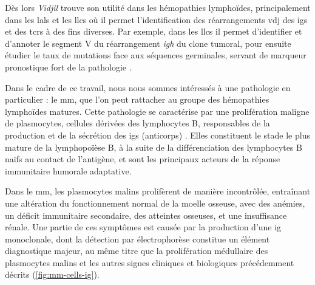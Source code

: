 

Dès lors \textit{Vidjil} trouve son utilité dans les hémopathies lymphoïdes, principalement dans les \glspl{lal} et les 
\glspl{llc} où il permet l'identification des réarrangements \gls{vdj} des \glspl{ig} et des \glspl{tcr} à des fins diverses.
Par exemple, dans les \glspl{llc} il permet d'identifier et d'annoter le segment V du réarrangement \textit{\gls{igh}} du clone tumoral, pour 
ensuite étudier le taux de mutations face aux séquences germinales, servant de marqueur pronostique fort de la pathologie
\cite{crombieIGHVMutationalStatus2017}.

\vspace{1em}

Dans le cadre de ce travail, nous nous sommes intéressés à une pathologie en particulier : le \gls{mm}, que l'on peut rattacher
au groupe des hémopathies lymphoïdes matures. Cette pathologie se caractérise par une prolifération maligne de plasmocytes, cellules
dérivées des lymphocytes B, responsables de la production et de la sécrétion des \glspl{ig} (anticorps) \cite{briglePathobiologyDiagnosisMultiple2017}. 
Elles constituent le stade le plus mature de la lymphopoïèse B, à la suite de la différenciation des lymphocytes B naïfs 
au contact de l'antigène, et sont les principaux acteurs de la réponse immunitaire humorale adaptative.

\vspace{1em}

Dans le \gls{mm}, les plasmocytes malins prolifèrent de manière incontrôlée, entraînant une altération du fonctionnement normal de la moelle osseuse,
avec des anémies, un déficit immunitaire secondaire, des atteintes osseuses, et une insuffisance rénale. Une partie de ces symptômes est causée
par la production d'une \gls{ig} monoclonale, dont la détection par électrophorèse constitue un élément diagnostique majeur, au même titre que la
prolifération médullaire des plasmocytes malins et les autres signes cliniques et biologiques précédemment décrits \cite{cowanDiagnosisManagementMultiple2022a} 
(\autoref{fig:mm-cells-ig}).

